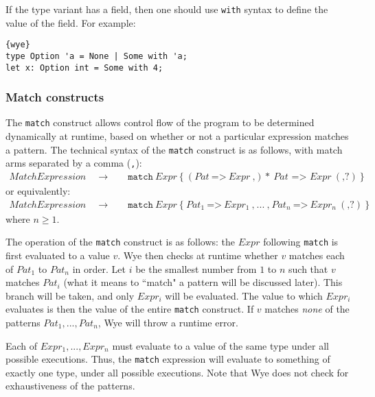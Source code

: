 \documentclass[a4paper, 12pt]{article}
\newcommand{\substo}{\quad\rightarrow\quad}
\begin{document}
If the type variant has a field, then one should use \texttt{with} syntax to define the value of the field. For example:
\begin{lstlisting}{wye}
type Option 'a = None | Some with 'a;
let x: Option int = Some with 4;
\end{lstlisting}

\subsubsection{Match constructs}
The \texttt{match} construct allows control flow of the program to be determined dynamically at runtime, based on whether or not a particular expression matches a pattern. The technical syntax of the \texttt{match} construct is as follows, with match arms separated by a comma (\texttt{,}):
\begin{align*}
MatchExpression \substo& \texttt{match}\: Expr \: \texttt{\{} \: (Pat \: \texttt{=>}\: Expr\: \texttt{,})*\: Pat\texttt{ => } Expr \: (\texttt{,}?) \: \texttt{\}}
\end{align*}
or equivalently:
\begin{align*}
MatchExpression \substo& \texttt{match}\: Expr \: \texttt{\{} \: Pat_1 \: \texttt{=>}\: Expr_1\: \texttt{,} \:  ... \: \texttt{,}\:Pat_n \: \texttt{=>}\: Expr_n\: (\texttt{,}?) \: \texttt{\}}
\end{align*}
where $n \geq 1$. 

The operation of the \texttt{match} construct is as follows: the $Expr$ following \texttt{match} is first evaluated to a value $v$. Wye then checks at runtime whether $v$ matches each of $Pat_1$ to $Pat_n$ in order. Let $i$ be the smallest number from $1$ to $n$ such that $v$ matches $Pat_i$ (what it means to ``match" a pattern will be discussed later). This branch will be taken, and only $Expr_i$ will be evaluated. The value to which $Expr_i$ evaluates is then the value of the entire \texttt{match} construct. If $v$ matches \textit{none} of the patterns $Pat_1, ..., Pat_n$, Wye will throw a runtime error. 

Each of $Expr_1, ..., Expr_n$ must evaluate to a value of the same type under all possible executions. Thus, the \texttt{match} expression will evaluate to something of exactly one type, under all possible executions. Note that Wye does not check for exhaustiveness of the patterns.
\end{document}
